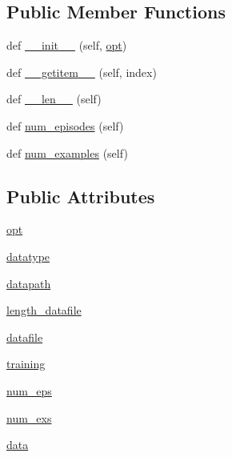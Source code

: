 \subsection*{Public Member Functions}
\begin{DoxyCompactItemize}
\item 
def \hyperlink{classparlai_1_1core_1_1pytorch__data__teacher_1_1ParlAIDataset_ac37c4338b73b65fd101bc926e8692366}{\+\_\+\+\_\+init\+\_\+\+\_\+} (self, \hyperlink{classparlai_1_1core_1_1pytorch__data__teacher_1_1ParlAIDataset_a5bf9f1b261c64e4ab37120ba6ed8b935}{opt})
\item 
def \hyperlink{classparlai_1_1core_1_1pytorch__data__teacher_1_1ParlAIDataset_ab9ea498b7257530c512c30c860452b40}{\+\_\+\+\_\+getitem\+\_\+\+\_\+} (self, index)
\item 
def \hyperlink{classparlai_1_1core_1_1pytorch__data__teacher_1_1ParlAIDataset_aaead6896e0da8032cef53af977359886}{\+\_\+\+\_\+len\+\_\+\+\_\+} (self)
\item 
def \hyperlink{classparlai_1_1core_1_1pytorch__data__teacher_1_1ParlAIDataset_a2b59aeb0c912cbee38cd6cd03f5d58db}{num\+\_\+episodes} (self)
\item 
def \hyperlink{classparlai_1_1core_1_1pytorch__data__teacher_1_1ParlAIDataset_afc5ca19cf94aad64c75e7799686efc7c}{num\+\_\+examples} (self)
\end{DoxyCompactItemize}
\subsection*{Public Attributes}
\begin{DoxyCompactItemize}
\item 
\hyperlink{classparlai_1_1core_1_1pytorch__data__teacher_1_1ParlAIDataset_a5bf9f1b261c64e4ab37120ba6ed8b935}{opt}
\item 
\hyperlink{classparlai_1_1core_1_1pytorch__data__teacher_1_1ParlAIDataset_a05192273eccb2399271159c081f8a4fa}{datatype}
\item 
\hyperlink{classparlai_1_1core_1_1pytorch__data__teacher_1_1ParlAIDataset_a64e2f65a3ef4b138f1de4780839d545a}{datapath}
\item 
\hyperlink{classparlai_1_1core_1_1pytorch__data__teacher_1_1ParlAIDataset_aa733f49329cc8c3a586eb61b157e7377}{length\+\_\+datafile}
\item 
\hyperlink{classparlai_1_1core_1_1pytorch__data__teacher_1_1ParlAIDataset_acca9d3d351fc78077bfa4fe9acd49212}{datafile}
\item 
\hyperlink{classparlai_1_1core_1_1pytorch__data__teacher_1_1ParlAIDataset_a37ac7bc953e6c36a284c6031af796bfa}{training}
\item 
\hyperlink{classparlai_1_1core_1_1pytorch__data__teacher_1_1ParlAIDataset_a4cdb36350cb9d6ea76b2c8eeb4bb1aaf}{num\+\_\+eps}
\item 
\hyperlink{classparlai_1_1core_1_1pytorch__data__teacher_1_1ParlAIDataset_abdd1801c6e081df8cdb22fcb207edb80}{num\+\_\+exs}
\item 
\hyperlink{classparlai_1_1core_1_1pytorch__data__teacher_1_1ParlAIDataset_a0306ea2e7c88845945b1712391f45297}{data}
\end{DoxyCompactItemize}


